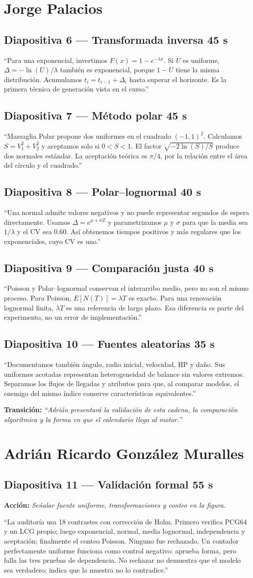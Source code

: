 \documentclass[11pt,a4paper]{article}
\newcommand{\slidecue}[4]{%
  \subsection*{\textcolor{outbreakgreen}{Diapositiva #1 --- #2}\hfill
  \normalfont\small #3}
  \noindent\colorbox{outbreakpale}{\parbox{\dimexpr\textwidth-2\fboxsep}{#4}}
  \vspace{0.45em}}
\newcommand{\stage}[1]{\textbf{\textcolor{outbreakamber}{Acción:}} \emph{#1}\par}
\newcommand{\handoff}[1]{\vspace{0.4em}\textbf{Transición:} \emph{#1}\par}
\begin{document}
\newpage
\section{Jorge Palacios}

\slidecue{6}{Transformada inversa}{45 s}{
``Para una exponencial, invertimos $F(x)=1-e^{-\lambda x}$. Si $U$ es uniforme,
$\Delta=-\ln(U)/\lambda$ también es exponencial, porque $1-U$ tiene la misma
distribución. Acumulamos $t_i=t_{i-1}+\Delta_i$ hasta superar el horizonte. Es
la primera técnica de generación vista en el curso.''
}

\slidecue{7}{Método polar}{45 s}{
``Marsaglia Polar propone dos uniformes en el cuadrado $(-1,1)^2$. Calculamos
$S=V_1^2+V_2^2$ y aceptamos solo si $0<S<1$. El factor
$\sqrt{-2\ln(S)/S}$ produce dos normales estándar. La aceptación teórica es
$\pi/4$, por la relación entre el área del círculo y el cuadrado.''
}

\slidecue{8}{Polar--lognormal}{40 s}{
``Una normal admite valores negativos y no puede representar segundos de
espera directamente. Usamos $\Delta=e^{\mu+\sigma Z}$ y parametrizamos $\mu$ y
$\sigma$ para que la media sea $1/\lambda$ y el CV sea 0.60. Así obtenemos
tiempos positivos y más regulares que los exponenciales, cuyo CV es uno.''
}

\slidecue{9}{Comparación justa}{40 s}{
``Poisson y Polar--lognormal conservan el interarribo medio, pero no son el
mismo proceso. Para Poisson, $E[N(T)]=\lambda T$ es exacto. Para una renovación
lognormal finita, $\lambda T$ es una referencia de largo plazo. Esa diferencia
es parte del experimento, no un error de implementación.''
}

\slidecue{10}{Fuentes aleatorias}{35 s}{
``Documentamos también ángulo, radio inicial, velocidad, HP y daño. Sus
uniformes acotadas representan heterogeneidad de balance sin valores extremos.
Separamos los flujos de llegadas y atributos para que, al comparar modelos, el
enemigo del mismo índice conserve características equivalentes.''
}

\handoff{``Adrián presentará la validación de esta cadena, la comparación
algorítmica y la forma en que el calendario llega al motor.''}

\newpage
\section{Adrián Ricardo González Muralles}

\slidecue{11}{Validación formal}{55 s}{
\stage{Señalar fuente uniforme, transformaciones y conteo en la figura.}
``La auditoría usa 18 contrastes con corrección de Holm. Primero verifica
PCG64 y un LCG propio; luego exponencial, normal, media lognormal,
independencia y aceptación; finalmente el conteo Poisson. Ninguno fue rechazado.
Un contador perfectamente uniforme funciona como control negativo: aprueba
forma, pero falla las tres pruebas de dependencia. No rechazar no demuestra que
el modelo sea verdadero; indica que la muestra no lo contradice.''
}
\end{document}

